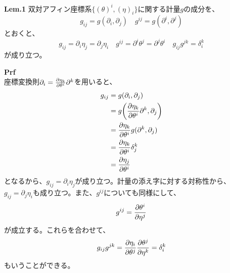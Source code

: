 \documentclass[a4paper,11pt]{jsarticle}
\numberwithin{equation}{section}
\begin{document}
    \begin{itembox}[l]{\textbf{Lem.1}}
        双対アフィン座標系$\{(\theta)^i,(\eta)_i\}$に関する計量$g$の成分を、
        \begin{equation}
            g_{ij} = g(\partial_i,\partial_j) \quad g^{ij} = g(\partial^i,\partial^j)
        \end{equation}
        とおくと、
        \begin{equation}
            g_{ij} = \partial_i \eta_j = \partial_j \eta_i \quad g^{ij} = \partial^i \theta^j = \partial^j \theta^i \quad g_{ij}g^{jk} = \delta_i^k
        \end{equation}
        が成り立つ。
    \end{itembox}
    \textbf{Prf}\\
    座標変換則$\partial_i = \pdv{\eta_k}{\theta^i}\partial^k$を用いると、
    \begin{align}
        g_{ij} &= g(\partial_i,\partial_j) \\
        &= g\qty(\pdv{\eta_k}{\theta^i}\partial^k,\partial_j) \\
        &= \pdv{\eta_k}{\theta^i}g(\partial^k,\partial_j) \\
        &= \pdv{\eta_k}{\theta^i}\delta_j^k \\
        &= \pdv{\eta_j}{\theta^i}
    \end{align}
    となるから、$g_{ij} = \partial_i \eta_j$が成り立つ。計量の添え字に対する対称性から、$g_{ij} = \partial_j \eta_i$も成り立つ。また、$g^{ij}$についても同様にして、
    \begin{align}
        g^{ij} = \pdv{\theta ^i}{\eta^j}
    \end{align}
    が成立する。これらを合わせて、
    \begin{align}
        g_{ij}g^{jk} = \pdv{\eta_i}{\theta^j}\pdv{\theta^j}{\eta^k} = \delta_i^k
    \end{align}
    もいうことができる。\hfill\qedsymbol
    
\end{document}
